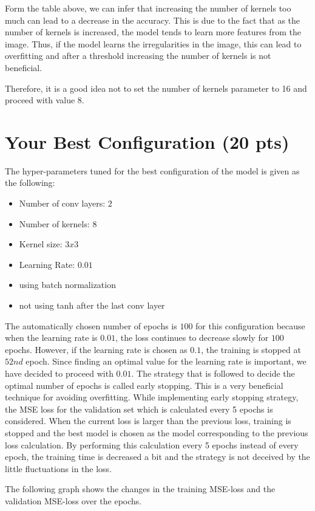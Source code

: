 \documentclass[12pt]{article}
\begin{document}
Form the table above, we can infer that increasing the number of kernels too much can lead to a decrease in the accuracy. This is due to the fact that as the number of kernels is increased, the model tends to learn more features from the image. Thus, if the model learns the irregularities in the image, this can lead to overfitting and after a threshold increasing the number of kernels is not beneficial.

Therefore, it is a good idea not to set the number of kernels parameter to 16 and proceed with value 8.

\section{Your Best Configuration (20 pts)}
The hyper-parameters tuned for the best configuration of the model is given as the following:

\begin{itemize}
	\item Number of conv layers: $2$
	\item Number of kernels: $8$
	\item Kernel size: $3x3$
	\item Learning Rate: $0.01$
	\item using batch normalization
	\item not using tanh after the last conv layer
\end{itemize}

The automatically chosen number of epochs is $100$ for this configuration because when the learning rate is $0.01$, the loss continues to decrease slowly for $100$ epochs. However, if the learning rate is chosen as $0.1$, the training is stopped at $52nd$ epoch. Since finding an optimal value for the learning rate is important, we have decided to proceed with $0.01$. The strategy that is followed to decide the optimal number of epochs is called early stopping. This is a very beneficial technique for avoiding overfitting. While implementing early stopping strategy, the MSE loss for the validation set which is calculated every 5 epochs is considered. When the current loss is larger than the previous loss, training is stopped and the best model is chosen as the model corresponding to the previous loss calculation. By performing this calculation every 5 epochs instead of every epoch, the training time is decreased a bit and the strategy is not deceived by the little fluctuations in the loss.

The following graph shows the changes in the training MSE-loss and the validation MSE-loss over the epochs.
\end{document}
